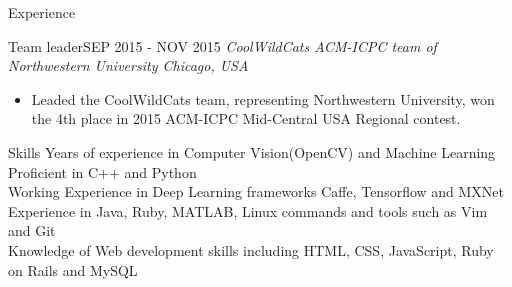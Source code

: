 \documentclass{resume} %
\begin{document}
\begin{rSection}{Experience}
\begin{rSubsection}{Team leader}{SEP 2015 - NOV 2015}{}
	{\em CoolWildCats ACM-ICPC team of Northwestern University \hfill Chicago, USA}
	

	\begin{itemize}
		\item Leaded the CoolWildCats team, representing Northwestern University, won the 4th place in 2015 ACM-ICPC Mid-Central USA Regional contest.
	\end{itemize}
\end{rSubsection}
\end{rSection}


\begin{rSection}{Skills}
	Years of experience in Computer Vision(OpenCV) and Machine Learning \\
	Proficient in C++ and Python \\
	Working Experience in Deep Learning frameworks Caffe, Tensorflow and MXNet \\
	Experience in Java, Ruby, MATLAB, Linux commands and tools such as Vim and Git \\ 
	Knowledge of Web development skills including HTML, CSS, JavaScript, Ruby on Rails and MySQL
	
\end{rSection}
\end{document}
